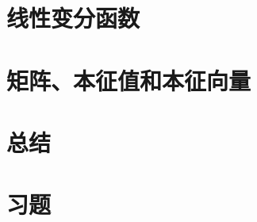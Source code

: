 \section{线性变分函数}
\label{sec:8.5 Linear Variational Functions}

















\section{矩阵、本征值和本征向量}
\label{sec:8.6 Matrices, Eigenvalues, and Eigenvectors}

\section*{总结}

\section*{习题}